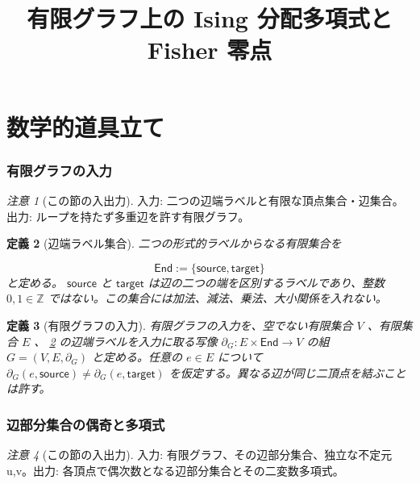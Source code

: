 \documentclass[11pt,a4paper]{article}
\title{有限グラフ上の Ising 分配多項式と Fisher 零点}
\author{}
\date{}
\newtheorem{definition}{定義}[section]
\theoremstyle{remark}
\newtheorem{remark}[definition]{注意}
\begin{document}
\maketitle
\part{数学的道具立て}

\section{有限グラフの入力}

\begin{remark}[この節の入出力]
入力: 二つの辺端ラベルと有限な頂点集合・辺集合。出力: ループを持たず多重辺を許す有限グラフ。

\end{remark}

\begin{definition}[辺端ラベル集合]\label{lab:def_edge_endpoint_label_set}
二つの形式的ラベルからなる有限集合を

\[\mathsf{End}:=\{\mathsf{source},\mathsf{target}\}\]
と定める。
$\mathsf{source}$
 と 
$\mathsf{target}$
 は辺の二つの端を区別するラベルであり、整数 
$0,1\in\mathbb Z$
 ではない。この集合には加法、減法、乗法、大小関係を入れない。

\end{definition}

\begin{definition}[有限グラフの入力]\label{lab:def_finite_graph_input}
有限グラフの入力を、空でない有限集合 
$V$
、有限集合 
$E$
、
\cref{lab:def_edge_endpoint_label_set}
 の辺端ラベルを入力に取る写像 
$\partial_G:E\times\mathsf{End}\to V$
 の組 
$G=(V,E,\partial_G)$
 と定める。任意の 
$e\in E$
 について 
$\partial_G(e,\mathsf{source})\ne\partial_G(e,\mathsf{target})$
 を仮定する。異なる辺が同じ二頂点を結ぶことは許す。

\end{definition}

\section{辺部分集合の偶奇と多項式}

\begin{remark}[この節の入出力]
入力: 有限グラフ、その辺部分集合、独立な不定元 u,v。出力: 各頂点で偶次数となる辺部分集合とその二変数多項式。

\end{remark}
\end{document}
